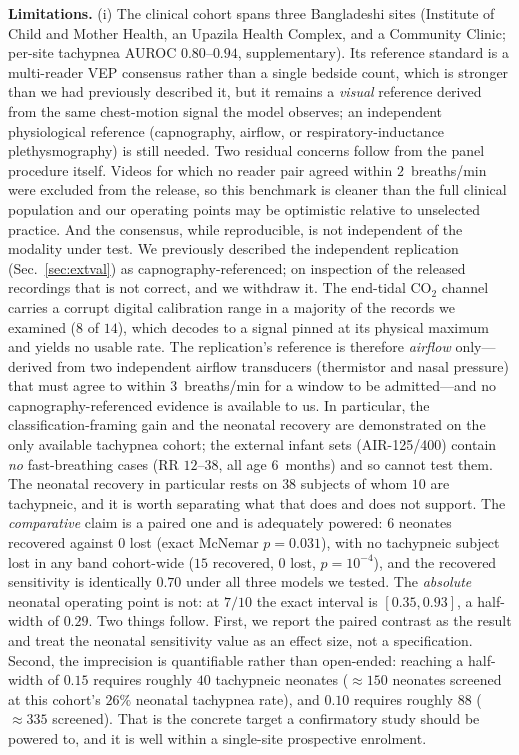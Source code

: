 \documentclass[journal]{IEEEtran}
\begin{document}
\textbf{Limitations.} (i) The clinical cohort spans three Bangladeshi sites (Institute of Child and Mother
Health, an Upazila Health Complex, and a Community Clinic; per-site tachypnea AUROC $0.80$--$0.94$,
supplementary). Its reference standard is a multi-reader VEP consensus rather than a single bedside
count, which is stronger than we had previously described it, but it remains a \emph{visual} reference
derived from the same chest-motion signal the model observes; an independent physiological reference
(capnography, airflow, or respiratory-inductance plethysmography) is still needed. Two residual
concerns follow from the panel procedure itself. Videos for which no reader pair agreed within
$2$~breaths/min were excluded from the release, so this benchmark is cleaner than the full clinical
population and our operating points may be optimistic relative to unselected practice. And the
consensus, while reproducible, is not independent of the modality under test. We previously described the
independent replication (Sec.~\ref{sec:extval}) as capnography-referenced; on inspection of the released
recordings that is not correct, and we withdraw it. The end-tidal CO$_2$ channel carries a corrupt
digital calibration range in a majority of the records we examined ($8$ of $14$), which decodes to a
signal pinned at its physical maximum and yields no usable rate. The replication's reference is
therefore \emph{airflow} only---derived from two independent airflow transducers (thermistor and nasal
pressure) that must agree to within $3$~breaths/min for a window to be admitted---and no
capnography-referenced evidence is available to us. In particular, the
classification-framing gain and the neonatal recovery are demonstrated on the only available tachypnea
cohort; the external infant sets (AIR-125/400) contain \emph{no} fast-breathing cases (RR $12$--$38$,
all age $6$~months) and so cannot test them. The neonatal recovery in particular rests on $38$ subjects of whom $10$ are tachypneic, and it is worth
separating what that does and does not support. The \emph{comparative} claim is a paired one and is
adequately powered: $6$ neonates recovered against $0$ lost (exact McNemar $p=0.031$), with no
tachypneic subject lost in any band cohort-wide ($15$ recovered, $0$ lost, $p=10^{-4}$), and the
recovered sensitivity is identically $0.70$ under all three models we tested. The \emph{absolute}
neonatal operating point is not: at $7/10$ the exact interval is $[0.35,0.93]$, a half-width of $0.29$.
Two things follow. First, we report the paired contrast as the result and treat the neonatal
sensitivity value as an effect size, not a specification. Second, the imprecision is quantifiable
rather than open-ended: reaching a half-width of $0.15$ requires roughly $40$ tachypneic neonates
($\approx\!150$ neonates screened at this cohort's $26\%$ neonatal tachypnea rate), and $0.10$ requires
roughly $88$ ($\approx\!335$ screened). That is the concrete target a confirmatory study should be
powered to, and it is well within a single-site prospective enrolment.
\end{document}

